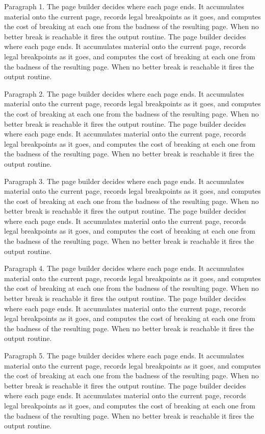 
Paragraph 1. The page builder decides where each page ends. It accumulates material onto the current page, records legal breakpoints as it goes, and computes the cost of breaking at each one from the badness of the resulting page. When no better break is reachable it fires the output routine. The page builder decides where each page ends. It accumulates material onto the current page, records legal breakpoints as it goes, and computes the cost of breaking at each one from the badness of the resulting page. When no better break is reachable it fires the output routine. 

Paragraph 2. The page builder decides where each page ends. It accumulates material onto the current page, records legal breakpoints as it goes, and computes the cost of breaking at each one from the badness of the resulting page. When no better break is reachable it fires the output routine. The page builder decides where each page ends. It accumulates material onto the current page, records legal breakpoints as it goes, and computes the cost of breaking at each one from the badness of the resulting page. When no better break is reachable it fires the output routine. 

Paragraph 3. The page builder decides where each page ends. It accumulates material onto the current page, records legal breakpoints as it goes, and computes the cost of breaking at each one from the badness of the resulting page. When no better break is reachable it fires the output routine. The page builder decides where each page ends. It accumulates material onto the current page, records legal breakpoints as it goes, and computes the cost of breaking at each one from the badness of the resulting page. When no better break is reachable it fires the output routine. 

Paragraph 4. The page builder decides where each page ends. It accumulates material onto the current page, records legal breakpoints as it goes, and computes the cost of breaking at each one from the badness of the resulting page. When no better break is reachable it fires the output routine. The page builder decides where each page ends. It accumulates material onto the current page, records legal breakpoints as it goes, and computes the cost of breaking at each one from the badness of the resulting page. When no better break is reachable it fires the output routine. 

Paragraph 5. The page builder decides where each page ends. It accumulates material onto the current page, records legal breakpoints as it goes, and computes the cost of breaking at each one from the badness of the resulting page. When no better break is reachable it fires the output routine. The page builder decides where each page ends. It accumulates material onto the current page, records legal breakpoints as it goes, and computes the cost of breaking at each one from the badness of the resulting page. When no better break is reachable it fires the output routine. 

